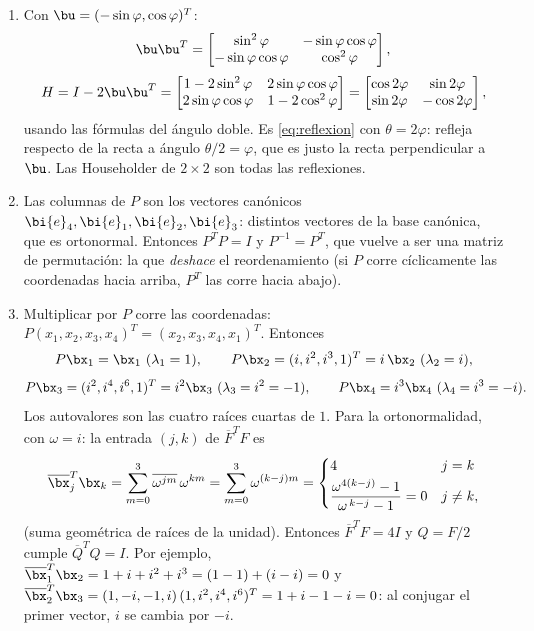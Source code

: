 \begin{enumerate}[leftmargin=*,label=\textbf{\thechapter.\arabic*}]
\item Con $\bu=(-\sin\varphi,\cos\varphi)^T$:
\[
\bu\bu^T=\begin{bmatrix}\sin^2\varphi&-\sin\varphi\cos\varphi\\
-\sin\varphi\cos\varphi&\cos^2\varphi\end{bmatrix},
\]
\[
H=I-2\bu\bu^T
=\begin{bmatrix}1-2\sin^2\varphi&2\sin\varphi\cos\varphi\\
2\sin\varphi\cos\varphi&1-2\cos^2\varphi\end{bmatrix}
=\begin{bmatrix}\cos2\varphi&\sin2\varphi\\ \sin2\varphi&-\cos2\varphi
\end{bmatrix},
\]
usando las fórmulas del ángulo doble. Es \eqref{eq:reflexion} con
$\theta=2\varphi$: refleja respecto de la recta a ángulo
$\theta/2=\varphi$, que es justo la recta perpendicular a $\bu$. Las
Householder de $2\times2$ son todas las reflexiones.

\item Las columnas de $P$ son los vectores canónicos
$\bi{e}_4,\bi{e}_1,\bi{e}_2,\bi{e}_3$: distintos vectores de la base
canónica, que es ortonormal. Entonces $P^T P=I$ y $P^{-1}=P^T$,
que vuelve a ser una matriz de permutación: la que \emph{deshace} el
reordenamiento (si $P$ corre cíclicamente las coordenadas hacia arriba,
$P^T$ las corre hacia abajo).

\item Multiplicar por $P$ corre las coordenadas: $P(x_1,x_2,x_3,x_4)^T
=(x_2,x_3,x_4,x_1)^T$. Entonces
\[
P\bx_1=\bx_1\ (\lambda_1=1),\qquad
P\bx_2=(i,i^2,i^3,1)^T=i\,\bx_2\ (\lambda_2=i),
\]
\[
P\bx_3=(i^2,i^4,i^6,1)^T=i^2\bx_3\ (\lambda_3=i^2=-1),\qquad
P\bx_4=i^3\bx_4\ (\lambda_4=i^3=-i).
\]
Los autovalores son las cuatro raíces cuartas de $1$. Para la
ortonormalidad, con $\omega=i$: la entrada $(j,k)$ de
$\overline{F}^T F$ es
\[
\overline{\bx}_j^T\bx_k=\sum_{m=0}^{3}\overline{\omega^{jm}}\,
\omega^{km}=\sum_{m=0}^{3}\omega^{(k-j)m}
=\begin{cases}4&j=k\\[2pt]
\dfrac{\omega^{4(k-j)}-1}{\omega^{\,k-j}-1}=0&j\ne k,\end{cases}
\]
(suma geométrica de raíces de la unidad). Entonces
$\overline{F}^T F=4I$ y $Q=F/2$ cumple $\overline{Q}^T Q=I$.
Por ejemplo,
$\overline{\bx}_1^T\bx_2=1+i+i^2+i^3=(1-1)+(i-i)=0$ y
$\overline{\bx}_2^T\bx_3=(1,-i,-1,i)\,(1,i^2,i^4,i^6)^T
=1+i-1-i=0$: al conjugar el primer vector, $i$ se cambia por $-i$.


\end{enumerate}
